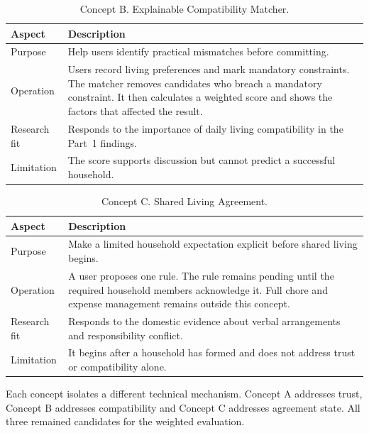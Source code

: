 \documentclass[11pt,a4paper]{article}
\begin{document}
\begin{table}[H]
    \centering
    \small
    \caption{Concept B. Explainable Compatibility Matcher.}
    \begin{tabularx}{\textwidth}{@{}L{3.2cm}Y@{}}
        \toprule
        Aspect & Description\\
        \midrule
        Purpose & Help users identify practical mismatches before committing.\\
        Operation & Users record living preferences and mark mandatory constraints. The matcher removes candidates who breach a mandatory constraint. It then calculates a weighted score and shows the factors that affected the result.\\
        Research fit & Responds to the importance of daily living compatibility in the Part~1 findings.\\
        Limitation & The score supports discussion but cannot predict a successful household.\\
        \bottomrule
    \end{tabularx}
    \label{tabconceptb}
\end{table}

\begin{table}[H]
    \centering
    \small
    \caption{Concept C. Shared Living Agreement.}
    \begin{tabularx}{\textwidth}{@{}L{3.2cm}Y@{}}
        \toprule
        Aspect & Description\\
        \midrule
        Purpose & Make a limited household expectation explicit before shared living begins.\\
        Operation & A user proposes one rule. The rule remains pending until the required household members acknowledge it. Full chore and expense management remains outside this concept.\\
        Research fit & Responds to the domestic evidence about verbal arrangements and responsibility conflict.\\
        Limitation & It begins after a household has formed and does not address trust or compatibility alone.\\
        \bottomrule
    \end{tabularx}
    \label{tabconceptc}
\end{table}

Each concept isolates a different technical mechanism. Concept A addresses trust, Concept B addresses compatibility and Concept C addresses agreement state. All three remained candidates for the weighted evaluation.
\end{document}
